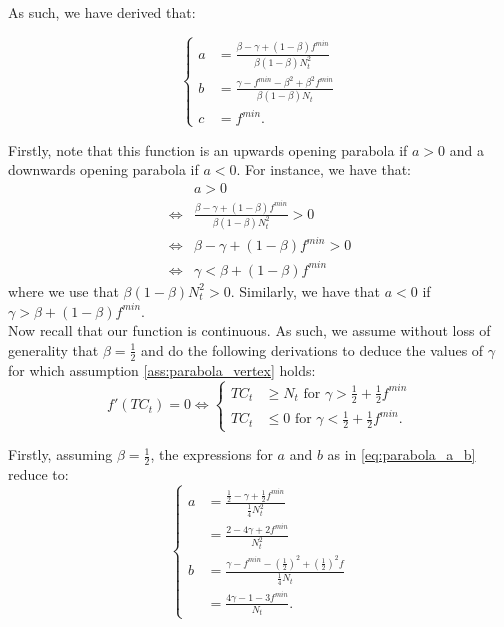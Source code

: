 \documentclass[12pt]{article}
\begin{document}
\begin{appendices}
        \noindent As such, we have derived that:
        
        \begin{equation} \label{eq:parabola_a_b}
		    \begin{cases}
		        a &= \frac{\beta - \gamma + (1-\beta)f^{min}}{\beta(1-\beta)N_t^2} \\
		        b &= \frac{\gamma - f^{min} - \beta^2 + \beta^2 f^{min}}{\beta(1-\beta)N_t} \\
		        c &= f^{min}.
		    \end{cases}
		\end{equation}
        
        Firstly, note that this function is an upwards opening parabola if $a>0$ and a downwards opening parabola if $a<0$. For instance, we have that:
        \begin{align*}
            & a > 0 \\
            \iff & \frac{\beta - \gamma + (1-\beta)f^{min}}{\beta(1-\beta)N_t^2} > 0 \\
            \iff & \beta - \gamma + (1-\beta)f^{min} > 0 \\
            \iff & \gamma < \beta + (1-\beta)f^{min}
        \end{align*}
        where we use that $\beta(1-\beta)N_t^2 > 0$. Similarly, we have that $a < 0$ if $\gamma > \beta + (1-\beta)f^{min}$. \\
        
        Now recall that our function is continuous. As such, we assume without loss of generality that $\beta = \frac{1}{2}$ and do the following derivations to deduce the values of $\gamma$ for which assumption \ref{ass:parabola_vertex} holds:
        \begin{equation*}
            f'(TC_t) = 0 \iff 
		    \begin{cases}
		        TC_t &\geq N_t \text{ for } \gamma > \frac{1}{2} + \frac{1}{2}f^{min} \\
		        TC_t &\leq 0 \text{ for } \gamma < \frac{1}{2} + \frac{1}{2}f^{min}.
		    \end{cases}
		\end{equation*}
		
		Firstly, assuming $\beta = \frac{1}{2}$, the expressions for $a$ and $b$ as in \eqref{eq:parabola_a_b} reduce to:
		\begin{equation} \label{eq:parabola_a_b_reduced}
		    \begin{cases}
		        a &= \frac{\frac{1}{2} - \gamma + \frac{1}{2}f^{min}}{\frac{1}{4}N_t^2} \\
		        &= \frac{2 - 4\gamma + 2f^{min}}{N_t^2} \\
		        b &= \frac{\gamma - f^{min} - \left(\frac{1}{2}\right)^2 + \left(\frac{1}{2}\right)^2 f}{\frac{1}{4}N_t} \\
		        &= \frac{4\gamma - 1 - 3f^{min}}{N_t}.
		    \end{cases}
		\end{equation}
		

\end{appendices}
\end{document}
